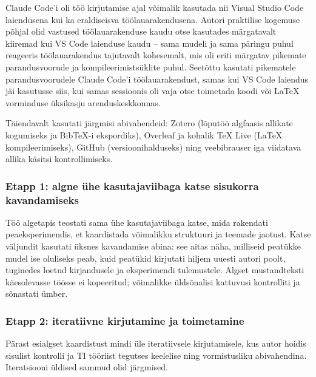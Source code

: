 Claude Code'i oli töö kirjutamise ajal võimalik kasutada nii Visual Studio Code laiendusena kui ka eraldiseisva töölaua\-rakendusena. Autori praktilise kogemuse põhjal olid vastused töölaua\-rakenduse kaudu otse kasutades märgatavalt kiiremad kui VS Code laienduse kaudu -- sama mudeli ja sama päringu puhul reageeris töölauarakendus tajutavalt kohesemalt, mis oli eriti märgatav pikemate parandusvoorude ja kompileerimistsüklite puhul. Seetõttu kasutati pikematele parandusvoorudele Claude Code'i töölauarakendust, samas kui VS Code laiendus jäi kasutusse siis, kui samas sessioonis oli vaja otse toimetada koodi või \LaTeX{} vorminduse üksikasju arenduskeskkonnas.

Täiendavalt kasutati järgmisi abivahendeid: Zotero (lõputöö algfaasis allikate kogumiseks ja BibTeX-i ekspordiks), Overleaf ja kohalik TeX Live (\LaTeX{} kompileerimiseks), GitHub (versioonihalduseks) ning veebibrauser iga viidatava allika käsitsi kontrollimiseks.

\subsubsection{Etapp 1: algne ühe kasutajaviibaga katse sisukorra kavandamiseks}

Töö algetapis teostati sama ühe kasutajaviibaga katse, mida rakendati peaeksperimendis, et kaardistada võimalikku struktuuri ja teemade jaotust. Katse väljundit kasutati üksnes kavandamise abina: see aitas näha, milliseid peatükke mudel ise oluliseks peab, kuid peatükid kirjutati hiljem uuesti autori poolt, tuginedes loetud kirjandusele ja eksperimendi tulemustele. Algset mustandteksti käesolevasse töösse ei kopeeritud; võimalikke üldsõnalisi kattuvusi kontrolliti ja sõnastati ümber.

\subsubsection{Etapp 2: iteratiivne kirjutamine ja toimetamine}

Pärast esialgset kaardistust mindi üle iteratiivsele kirjutamisele, kus autor hoidis sisulist kontrolli ja TI tööriist tegutses keelelise ning vormistusliku abivahendina. Iteratsiooni üldised sammud olid järgmised.

